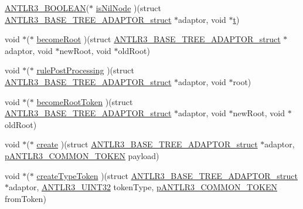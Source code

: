 \begin{DoxyCompactItemize}
\item 
\hyperlink{antlr3defs_8h_a5b33dccbba3b7212539695e21df4079b}{A\-N\-T\-L\-R3\-\_\-\-B\-O\-O\-L\-E\-A\-N}($\ast$ \hyperlink{struct_a_n_t_l_r3___b_a_s_e___t_r_e_e___a_d_a_p_t_o_r__struct_a7e03c6edbe6f3033d3553aa486d65fcf}{is\-Nil\-Node} )(struct \hyperlink{struct_a_n_t_l_r3___b_a_s_e___t_r_e_e___a_d_a_p_t_o_r__struct}{A\-N\-T\-L\-R3\-\_\-\-B\-A\-S\-E\-\_\-\-T\-R\-E\-E\-\_\-\-A\-D\-A\-P\-T\-O\-R\-\_\-struct} $\ast$adaptor, void $\ast$\hyperlink{showimage_8m_ad941f6ef920fbfb3d75b60ddbedbdd39}{t})
\item 
void $\ast$($\ast$ \hyperlink{struct_a_n_t_l_r3___b_a_s_e___t_r_e_e___a_d_a_p_t_o_r__struct_a2433dcf8544c3c5e8168494f81f411cf}{become\-Root} )(struct \hyperlink{struct_a_n_t_l_r3___b_a_s_e___t_r_e_e___a_d_a_p_t_o_r__struct}{A\-N\-T\-L\-R3\-\_\-\-B\-A\-S\-E\-\_\-\-T\-R\-E\-E\-\_\-\-A\-D\-A\-P\-T\-O\-R\-\_\-struct} $\ast$adaptor, void $\ast$new\-Root, void $\ast$old\-Root)
\item 
void $\ast$($\ast$ \hyperlink{struct_a_n_t_l_r3___b_a_s_e___t_r_e_e___a_d_a_p_t_o_r__struct_ab6be897e50433fd8ceec35994a62db62}{rule\-Post\-Processing} )(struct \hyperlink{struct_a_n_t_l_r3___b_a_s_e___t_r_e_e___a_d_a_p_t_o_r__struct}{A\-N\-T\-L\-R3\-\_\-\-B\-A\-S\-E\-\_\-\-T\-R\-E\-E\-\_\-\-A\-D\-A\-P\-T\-O\-R\-\_\-struct} $\ast$adaptor, void $\ast$root)
\item 
void $\ast$($\ast$ \hyperlink{struct_a_n_t_l_r3___b_a_s_e___t_r_e_e___a_d_a_p_t_o_r__struct_a12c6658e21e36b77235aaeacbaf1c7fd}{become\-Root\-Token} )(struct \hyperlink{struct_a_n_t_l_r3___b_a_s_e___t_r_e_e___a_d_a_p_t_o_r__struct}{A\-N\-T\-L\-R3\-\_\-\-B\-A\-S\-E\-\_\-\-T\-R\-E\-E\-\_\-\-A\-D\-A\-P\-T\-O\-R\-\_\-struct} $\ast$adaptor, void $\ast$new\-Root, void $\ast$old\-Root)
\item 
void $\ast$($\ast$ \hyperlink{struct_a_n_t_l_r3___b_a_s_e___t_r_e_e___a_d_a_p_t_o_r__struct_a78bbafa130ea2650ef6d5d9825451209}{create} )(struct \hyperlink{struct_a_n_t_l_r3___b_a_s_e___t_r_e_e___a_d_a_p_t_o_r__struct}{A\-N\-T\-L\-R3\-\_\-\-B\-A\-S\-E\-\_\-\-T\-R\-E\-E\-\_\-\-A\-D\-A\-P\-T\-O\-R\-\_\-struct} $\ast$adaptor, \hyperlink{antlr3interfaces_8h_adaa6df9cbf0cd7ab37fd545520ff299b}{p\-A\-N\-T\-L\-R3\-\_\-\-C\-O\-M\-M\-O\-N\-\_\-\-T\-O\-K\-E\-N} payload)
\item 
void $\ast$($\ast$ \hyperlink{struct_a_n_t_l_r3___b_a_s_e___t_r_e_e___a_d_a_p_t_o_r__struct_a448069bda9099ebeef8ec81fe93c54d6}{create\-Type\-Token} )(struct \hyperlink{struct_a_n_t_l_r3___b_a_s_e___t_r_e_e___a_d_a_p_t_o_r__struct}{A\-N\-T\-L\-R3\-\_\-\-B\-A\-S\-E\-\_\-\-T\-R\-E\-E\-\_\-\-A\-D\-A\-P\-T\-O\-R\-\_\-struct} $\ast$adaptor, \hyperlink{antlr3defs_8h_ac41f744abd0fd25144b9eb9d11b1dfd1}{A\-N\-T\-L\-R3\-\_\-\-U\-I\-N\-T32} token\-Type, \hyperlink{antlr3interfaces_8h_adaa6df9cbf0cd7ab37fd545520ff299b}{p\-A\-N\-T\-L\-R3\-\_\-\-C\-O\-M\-M\-O\-N\-\_\-\-T\-O\-K\-E\-N} from\-Token)

\end{DoxyCompactItemize}

